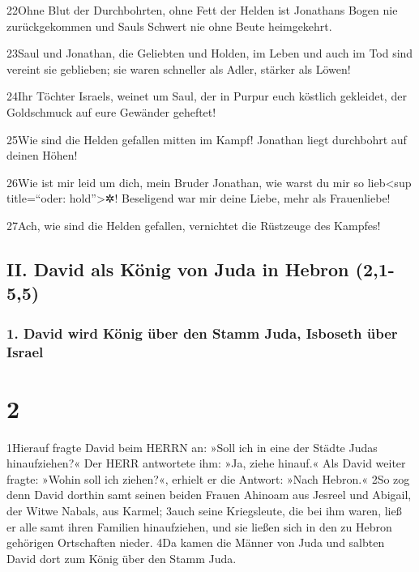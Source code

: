 22Ohne Blut der Durchbohrten, ohne Fett der Helden ist Jonathans Bogen
nie zurückgekommen und Sauls Schwert nie ohne Beute heimgekehrt.

23Saul und Jonathan, die Geliebten und Holden, im Leben und auch im Tod
sind vereint sie geblieben; sie waren schneller als Adler, stärker als
Löwen!

24Ihr Töchter Israels, weinet um Saul, der in Purpur euch köstlich
gekleidet, der Goldschmuck auf eure Gewänder geheftet!

25Wie sind die Helden gefallen mitten im Kampf! Jonathan liegt
durchbohrt auf deinen Höhen!

26Wie ist mir leid um dich, mein Bruder Jonathan, wie warst du mir so
lieb\textless sup title=``oder: hold''\textgreater✲! Beseligend war mir
deine Liebe, mehr als Frauenliebe!

27Ach, wie sind die Helden gefallen, vernichtet die Rüstzeuge des
Kampfes!

\hypertarget{ii.-david-als-kuxf6nig-von-juda-in-hebron-21-55}{%
\subsection{II. David als König von Juda in Hebron
(2,1-5,5)}\label{ii.-david-als-kuxf6nig-von-juda-in-hebron-21-55}}

\hypertarget{david-wird-kuxf6nig-uxfcber-den-stamm-juda-isboseth-uxfcber-israel}{%
\subsubsection{1. David wird König über den Stamm Juda, Isboseth über
Israel}\label{david-wird-kuxf6nig-uxfcber-den-stamm-juda-isboseth-uxfcber-israel}}

\hypertarget{section-1}{%
\section{2}\label{section-1}}

1Hierauf fragte David beim HERRN an: »Soll ich in eine der Städte Judas
hinaufziehen?« Der HERR antwortete ihm: »Ja, ziehe hinauf.« Als David
weiter fragte: »Wohin soll ich ziehen?«, erhielt er die Antwort: »Nach
Hebron.« 2So zog denn David dorthin samt seinen beiden Frauen Ahinoam
aus Jesreel und Abigail, der Witwe Nabals, aus Karmel; 3auch seine
Kriegsleute, die bei ihm waren, ließ er alle samt ihren Familien
hinaufziehen, und sie ließen sich in den zu Hebron gehörigen Ortschaften
nieder. 4Da kamen die Männer von Juda und salbten David dort zum König
über den Stamm Juda.

